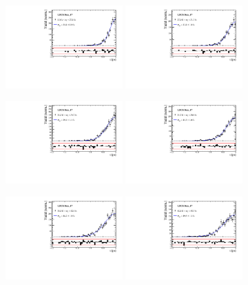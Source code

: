 \begin{figure}[h]
\centering
\includegraphics[height=!,width=0.4\textwidth]{figs/Resolution/SignalData_17_bin_1.pdf}
\includegraphics[height=!,width=0.4\textwidth]{figs/Resolution/SignalData_17_bin_2.pdf}

\includegraphics[height=!,width=0.4\textwidth]{figs/Resolution/SignalData_17_bin_3.pdf}
\includegraphics[height=!,width=0.4\textwidth]{figs/Resolution/SignalData_17_bin_4.pdf}

\includegraphics[height=!,width=0.4\textwidth]{figs/Resolution/SignalData_17_bin_5.pdf}
\includegraphics[height=!,width=0.4\textwidth]{figs/Resolution/SignalData_17_bin_6.pdf}


\end{figure}
